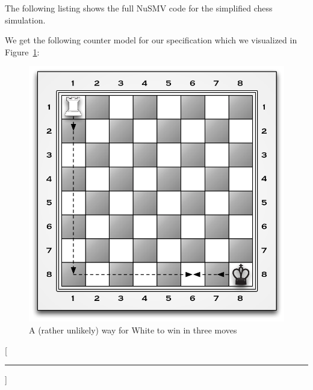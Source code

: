 \documentclass[a4paper, 12pt]{article}
\newcommand{\codeinput}[1]
{
    \begin{leftbar}
        {\fontsize{9pt}{11pt}}
    \end{leftbar}
}
\begin{document}
The following listing shows the full NuSMV code for the simplified chess
simulation.

\codeinput{chess}

We get the following counter model for our specification which we visualized
in Figure~\ref{figure:Figures_Chess_White_Wins_In_Three_Moves}:

\codeinput{counterexample}

\begin{figure}[htbp]
    \centering
        \includegraphics[width=.48\textwidth]
            {Figures/Chess - White Wins In Three Moves.pdf}
    \caption{A (rather unlikely) way for White to win in three moves}
    \label{figure:Figures_Chess_White_Wins_In_Three_Moves}
\end{figure}


\titleformat{\section}{\sffamily\bfseries}{}{0pt}{}[{\color{aqua}\hrule}]
\printbibliography
\end{document}
